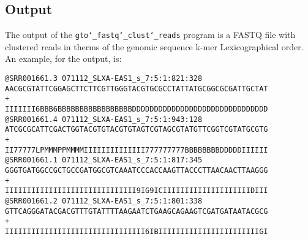 \subsection*{Output}
The output of the \texttt{gto\char`_fastq\char`_clust\char`_reads} program is a FASTQ file with clustered reads in therms of the genomic sequence k-mer Lexicographical order.
An example, for the output, is:
\begin{lstlisting}
@SRR001661.3 071112_SLXA-EAS1_s_7:5:1:821:328
AACGCGTATTCGGAGCTTCTTCGTTGGGTACGTGCGCCTATTATGCGGCGCGATTGCTAT
+
IIIIIII6BBB6BBBBBBBBBBBBBBBBBDDDDDDDDDDDDDDDDDDDDDDDDDDDDDDD
@SRR001661.4 071112_SLXA-EAS1_s_7:5:1:943:128
ATCGCGCATTCGACTGGTACGTGTACGTGTAGTCGTAGCGTATGTTCGGTCGTATGCGTG
+
II77777LPMMMPPMMMMIIIIIIIIIIIIII777777777BBBBBBBBDDDDDIIIIII
@SRR001661.1 071112_SLXA-EAS1_s_7:5:1:817:345
GGGTGATGGCCGCTGCCGATGGCGTCAAATCCCACCAAGTTACCCTTAACAACTTAAGGG
+
IIIIIIIIIIIIIIIIIIIIIIIIIIIIII9IG9ICIIIIIIIIIIIIIIIIIIIIDIII
@SRR001661.2 071112_SLXA-EAS1_s_7:5:1:801:338
GTTCAGGGATACGACGTTTGTATTTTAAGAATCTGAAGCAGAAGTCGATGATAATACGCG
+
IIIIIIIIIIIIIIIIIIIIIIIIIIIIIIII6IBIIIIIIIIIIIIIIIIIIIIIIIGI
\end{lstlisting}
